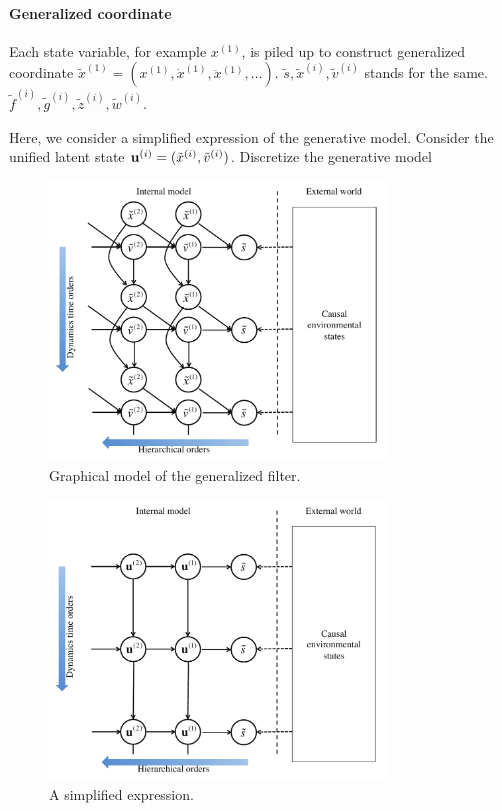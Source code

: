 \documentclass{article}
\begin{document}
\paragraph{Generalized coordinate}
Each state variable, for example $x^{(1)}$, is
piled up to construct generalized coordinate
 $\tilde{x}^{(1)}=(x^{(1)},\dot{x}^{(1)}, \ddot{x}^{(1)}, ...)$.
$\tilde{s}, \tilde{x}^{(i)}, \tilde{v}^{(i)}$ stands for the same.
$\tilde{f}^{(i)}, \tilde{g}^{(i)},\tilde{z}^{(i)} ,\tilde{w}^{(i)}$.

Here, we consider a simplified expression of the generative model.
Consider the unified latent state ${\bf u}^{(i)} = ( \tilde{x}^{(i)}, \tilde{v}^{(i)})$.
Discretize the generative model 

\begin{figure}[htbp]
  \includegraphics[width=0.8\textwidth]{../figures/gmodel_GF.pdf}
  \caption{Graphical model of the generalized filter. \cite{} }
  \label{g_GF}
\end{figure}
\begin{figure}[htbp]
  \includegraphics[width=0.8\textwidth]{../figures/gmodel_GF_simple.pdf}
  \caption{A simplified expression. }
  \label{g_GF_simple}
\end{figure}
\end{document}

